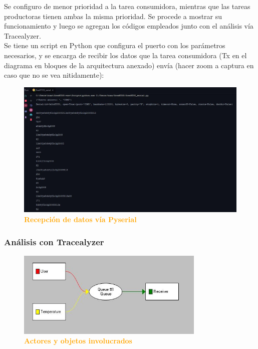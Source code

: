 \documentclass{article}
\begin{document}
 Se configuro de menor prioridad a la tarea consumidora, mientras que las tareas productoras tienen ambas la misma prioridad. Se procede a mostrar su funcionamiento y luego se agregan los códigos empleados junto con el análisis vía Tracealyzer.\\
 
 
Se tiene un script en Python que configura el puerto con los parámetros necesarios, y se encarga de recibir los datos que la tarea consumidora (Tx en el diagrama en bloques de la arquitectura anexado) envía (hacer zoom a captura en caso que no se vea nitidamente):
\begin{figure}[H]
   \centering
   \includegraphics[width=1.0\textwidth]{figures/serial.jpg}
   \centering
   \caption{\textbf{\textcolor{Orange}{Recepción de datos vía Pyserial}}}
\end{figure}


\subsubsection{Análisis con Tracealyzer}

\begin{figure}[H]
   \centering
   \includegraphics[width=0.8\textwidth]{figures/trace9.jpg}
   \centering
   \caption{\textbf{\textcolor{Orange}{Actores y objetos involucrados}}}
\end{figure}
\end{document}
